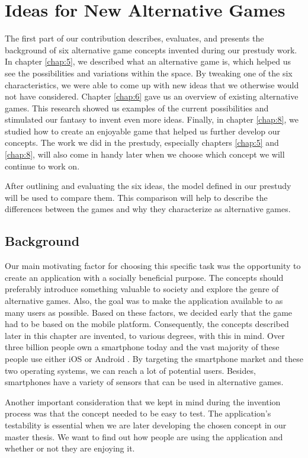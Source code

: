 \documentclass[../Main.tex]{subfiles}
\begin{document}
\section{Ideas for New Alternative Games}
\label{chap:9}
The first part of our contribution describes, evaluates, and presents the background of six alternative game concepts invented during our prestudy work. In chapter \ref{chap:5}, we described what an alternative game is, which helped us see the possibilities and variations within the space. By tweaking one of the six characteristics, we were able to come up with new ideas that we otherwise would not have considered. Chapter \ref{chap:6} gave us an overview of existing alternative games. This research showed us examples of the current possibilities and stimulated our fantasy to invent even more ideas. Finally, in chapter \ref{chap:8}, we studied how to create an enjoyable game that helped us further develop our concepts. The work we did in the prestudy, especially chapters \ref{chap:5} and \ref{chap:8}, will also come in handy later when we choose which concept we will continue to work on.

After outlining and evaluating the six ideas, the model defined in our prestudy will be used to compare them. This comparison will help to describe the differences between the games and why they characterize as alternative games.

\subsection{Background}
Our main motivating factor for choosing this specific task was the opportunity to create an application with a socially beneficial purpose. The concepts should preferably introduce something valuable to society and explore the genre of alternative games. Also, the goal was to make the application available to as many users as possible. Based on these factors, we decided early that the game had to be based on the mobile platform. Consequently, the concepts described later in this chapter are invented, to various degrees, with this in mind. Over three billion people own a smartphone today \citep{odea_smartphone_2020} and the vast majority of these people use either iOS or Android \citep{statcounter_mobile_2020}. By targeting the smartphone market and these two operating systems, we can reach a lot of potential users. Besides, smartphones have a variety of sensors that can be used in alternative games.

Another important consideration that we kept in mind during the invention process was that the concept needed to be easy to test. The application’s testability is essential when we are later developing the chosen concept in our master thesis. We want to find out how people are using the application and whether or not they are enjoying it.
\end{document}
